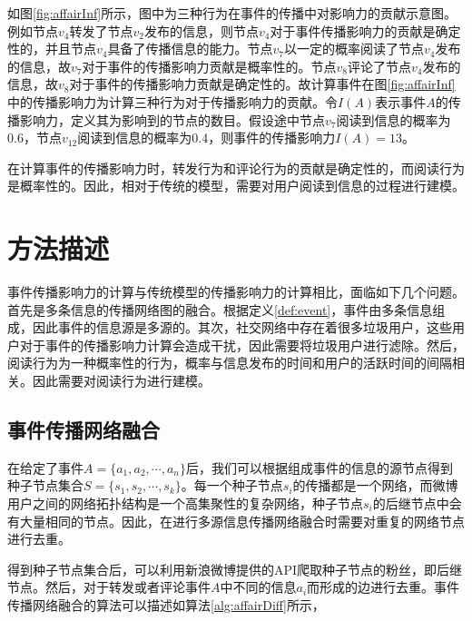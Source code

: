 如图\ref{fig:affairInf}所示，图中为三种行为在事件的传播中对影响力的贡献示意图。例如节点$v_4$转发了节点$v_2$发布的信息，则节点$v_4$对于事件传播影响力的贡献是确定性的，并且节点$v_4$具备了传播信息的能力。节点$v_7$以一定的概率阅读了节点$v_4$发布的信息，故$v_7$对于事件的传播影响力贡献是概率性的。节点$v_8$评论了节点$v_4$发布的信息，故$v_8$对于事件的传播影响力贡献是确定性的。故计算事件在图\ref{fig:affairInf}中的传播影响力为计算三种行为对于传播影响力的贡献。令$I\left(A\right)$表示事件$A$的传播影响力，定义其为影响到的节点的数目。假设途中节点$v_7$阅读到信息的概率为0.6，节点$v_{12}$阅读到信息的概率为0.4，则事件的传播影响力$I\left(A\right)=13$。

在计算事件的传播影响力时，转发行为和评论行为的贡献是确定性的，而阅读行为是概率性的。因此，相对于传统的模型，需要对用户阅读到信息的过程进行建模。
\section{方法描述}
\label{sec5:method}
事件传播影响力的计算与传统模型的传播影响力的计算相比，面临如下几个问题。首先是多条信息的传播网络图的融合。根据定义\ref{def:event}，事件由多条信息组成，因此事件的信息源是多源的。其次，社交网络中存在着很多垃圾用户，这些用户对于事件的传播影响力计算会造成干扰，因此需要将垃圾用户进行滤除。然后，阅读行为为一种概率性的行为，概率与信息发布的时间和用户的活跃时间的间隔相关。因此需要对阅读行为进行建模。
\subsection{事件传播网络融合}
\label{subsec5:mix}
在给定了事件$A=\{a_1, a_2, \cdots, a_n\}$后，我们可以根据组成事件的信息的源节点得到种子节点集合$S=\{s_1,s_2,\cdots,s_k\}$。每一个种子节点$s_i$的传播都是一个网络，而微博用户之间的网络拓扑结构是一个高集聚性的复杂网络，种子节点$s_i$的后继节点中会有大量相同的节点。因此，在进行多源信息传播网络融合时需要对重复的网络节点进行去重。

得到种子节点集合后，可以利用新浪微博提供的API爬取种子节点的粉丝，即后继节点。然后，对于转发或者评论事件$A$中不同的信息$a_i$而形成的边进行去重。事件传播网络融合的算法可以描述如算法\ref{alg:affairDiff}所示，


